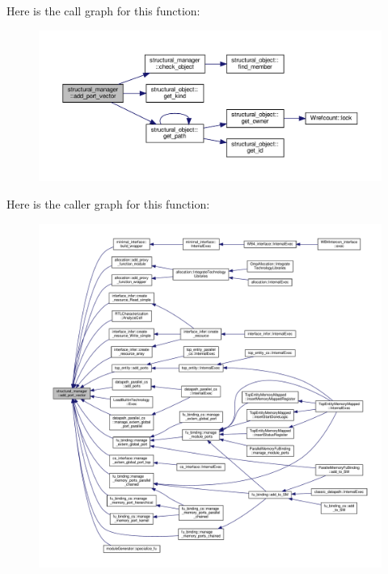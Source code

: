 Here is the call graph for this function\+:
\nopagebreak
\begin{figure}[H]
\begin{center}
\leavevmode
\includegraphics[width=350pt]{d7/d6b/classstructural__manager_adbb58bf2d0c87da20466cf199a678b5b_cgraph}
\end{center}
\end{figure}
Here is the caller graph for this function\+:
\nopagebreak
\begin{figure}[H]
\begin{center}
\leavevmode
\includegraphics[width=350pt]{d7/d6b/classstructural__manager_adbb58bf2d0c87da20466cf199a678b5b_icgraph}
\end{center}
\end{figure}
\mbox{\label{classstructural__manager_a2205427232393aa5217d394a000a5dde}} 
